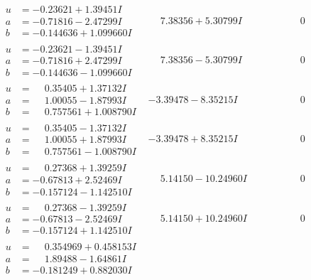 \documentclass[1p]{elsarticle_modified}
\theoremstyle{definition}
\begin{document}
$$\begin{array}{c|c|c}
 \hline 
\begin{aligned}
u &= -0.23621 + 1.39451 I \\
a &= -0.71816 - 2.47299 I \\
b &= -0.144636 + 1.099660 I\end{aligned}
 & \phantom{-}7.38356 + 5.30799 I & \phantom{-0.000000 } 0 \\ \hline\begin{aligned}
u &= -0.23621 - 1.39451 I \\
a &= -0.71816 + 2.47299 I \\
b &= -0.144636 - 1.099660 I\end{aligned}
 & \phantom{-}7.38356 - 5.30799 I & \phantom{-0.000000 } 0 \\ \hline\begin{aligned}
u &= \phantom{-}0.35405 + 1.37132 I \\
a &= \phantom{-}1.00055 - 1.87993 I \\
b &= \phantom{-}0.757561 + 1.008790 I\end{aligned}
 & -3.39478 - 8.35215 I & \phantom{-0.000000 } 0 \\ \hline\begin{aligned}
u &= \phantom{-}0.35405 - 1.37132 I \\
a &= \phantom{-}1.00055 + 1.87993 I \\
b &= \phantom{-}0.757561 - 1.008790 I\end{aligned}
 & -3.39478 + 8.35215 I & \phantom{-0.000000 } 0 \\ \hline\begin{aligned}
u &= \phantom{-}0.27368 + 1.39259 I \\
a &= -0.67813 + 2.52469 I \\
b &= -0.157124 - 1.142510 I\end{aligned}
 & \phantom{-}5.14150 - 10.24960 I & \phantom{-0.000000 } 0 \\ \hline\begin{aligned}
u &= \phantom{-}0.27368 - 1.39259 I \\
a &= -0.67813 - 2.52469 I \\
b &= -0.157124 + 1.142510 I\end{aligned}
 & \phantom{-}5.14150 + 10.24960 I & \phantom{-0.000000 } 0 \\ \hline\begin{aligned}
u &= \phantom{-}0.354969 + 0.458153 I \\
a &= \phantom{-}1.89488 - 1.64861 I \\
b &= -0.181249 + 0.882030 I\end{aligned}

\end{array}$$
\end{document}
